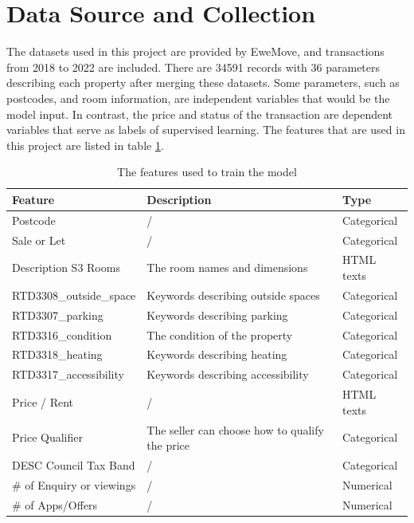 \documentclass[12pt,twoside]{report}
\begin{document}
\section{Data Source and Collection}
The datasets used in this project are provided by EweMove, and transactions from 2018 to 2022 are included. There are 34591 records with 36 parameters describing each property after merging these datasets. Some parameters, such as postcodes, and room information, are independent variables that would be the model input. In contrast, the price and status of the transaction are dependent variables that serve as labels of supervised learning. The features that are used in this project are listed in table \ref{model_input_features}. 

\begin{table}[H]
	\centering
	\caption{The features used to train the model}
	\label{model_input_features}
	\begin{tabular}{| l | l | l |}
		\hline
		\textbf{Feature} & \textbf{Description} & \textbf{Type} \\
		\hline
		Postcode & / & Categorical \\
		\hline
		Sale or Let & / & Categorical \\
		\hline
		Description S3 Rooms & The room names and dimensions & HTML texts\\
		\hline
		RTD3308\_outside\_space & Keywords describing outside spaces & Categorical \\ 
		\hline
		RTD3307\_parking& Keywords describing parking & Categorical \\
		\hline
		RTD3316\_condition & The condition of the property & Categorical \\
		\hline
		RTD3318\_heating & Keywords describing heating & Categorical \\
		\hline
		RTD3317\_accessibility & Keywords describing accessibility & Categorical \\
		\hline
		Price / Rent & / & HTML texts \\
		\hline
		Price Qualifier & The seller can choose how to qualify the price & Categorical \\
		\hline
		DESC Council Tax Band & / & Categorical \\
		\hline
		\# of Enquiry or viewings & / & Numerical \\
		\hline
		\# of Apps/Offers & / & Numerical \\
		\hline
	\end{tabular}
\end{table}
\end{document}
